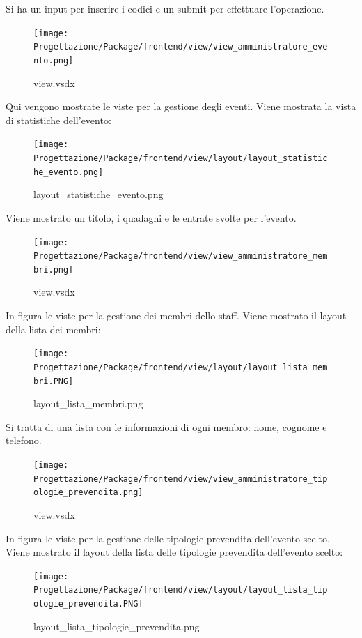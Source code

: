 \documentclass[a4paper]{article}
\begin{document}
Si ha un input per inserire i codici e un submit per effettuare l'operazione.

\newpage

\begin{figure}[H]
    \texttt{[image: Progettazione/Package/frontend/view/view\_amministratore\_evento.png]}
    \centering
    \caption{view.vsdx}
\end{figure}

Qui vengono mostrate le viste per la gestione degli eventi. Viene mostrata la vista di statistiche dell'evento:

\begin{figure}[H]
    \texttt{[image: Progettazione/Package/frontend/view/layout/layout\_statistiche\_evento.png]}
    \centering
    \caption{layout\_statistiche\_evento.png}
\end{figure}

Viene mostrato un titolo, i quadagni e le entrate svolte per l'evento.

\newpage

\begin{figure}[H]
    \texttt{[image: Progettazione/Package/frontend/view/view\_amministratore\_membri.png]}
    \centering
    \caption{view.vsdx}
\end{figure}

In figura le viste per la gestione dei membri dello staff. Viene mostrato il layout della lista dei membri:

\begin{figure}[H]
    \texttt{[image: Progettazione/Package/frontend/view/layout/layout\_lista\_membri.PNG]}
    \centering
    \caption{layout\_lista\_membri.png}
\end{figure}

Si tratta di una lista con le informazioni di ogni membro: nome, cognome e telefono.

\newpage

\begin{figure}[H]
    \texttt{[image: Progettazione/Package/frontend/view/view\_amministratore\_tipologie\_prevendita.png]}
    \centering
    \caption{view.vsdx}
\end{figure}

In figura le viste per la gestione delle tipologie prevendita dell'evento scelto. Viene mostrato il layout della lista delle tipologie prevendita dell'evento scelto:

\begin{figure}[H]
    \texttt{[image: Progettazione/Package/frontend/view/layout/layout\_lista\_tipologie\_prevendita.PNG]}
    \centering
    \caption{layout\_lista\_tipologie\_prevendita.png}
\end{figure}
\end{document}
